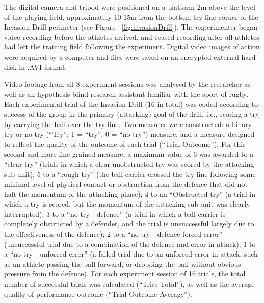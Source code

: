 \begin{CJK}{UTF8}{gbsn}
The digital camera and tripod were positioned on a platform 2m above the level of the playing field, approximately 10-15m from the bottom try-line corner of the Invasion Drill perimeter (see Figure ~\ref{fig:invasionDrill}). The experimenter began video recording before the athletes arrived, and ceased recording after all athletes had left the training field following the experiment. Digital video images of action were acquired by a computer and files were saved on an encrypted external hard disk in .AVI format.


Video footage from all 8 experiment sessions was analysed by the researcher as well as an hypothesis blind research assistant familiar with the sport of rugby.  Each experimental trial of the Invasion Drill (16 in total) was coded according to success of the group in the primary (attacking) goal of the drill, i.e., scoring a try by carrying the ball over the try line.  Two measures were constructed: a binary try or no try (``Try''; 1 = ``try'', 0 = ``no try'') measure, and a measure designed to reflect the quality of the outcome of each trial (``Trial Outcome''). For this second and more fine-grained measure, a maximum value of 6 was awarded to a ``clear try'' (trials in which a clear unobstructed try was scored by the attacking sub-unit); 5 to a ``rough try'' (the ball-carrier crossed the try-line following some minimal level of physical contact or obstruction from the defence that did not halt the momentum of the attacking phase); 4 to an ``Obstructed try'' (a trial in which a try is scored, but the momentum of the attacking sub-unit was clearly interrupted); 3 to a ``no try - defence'' (a trial in which a ball carrier is completely obstructed by a defender, and the trial is unsuccessful largely due to the effectiveness of the defence); 2 to a ``no try - defence forced error'' (unsuccessful trial due to a combination of the defence and error in attack); 1 to a ``no try - unforced error'' (a failed trial due to an unforced error in attack, such as an athlete passing the ball forward, or dropping the ball without obvious pressure from the defence).  For each experiment session of 16 trials, the total number of successful trials was calculated (``Tries Total''), as well as the average quality of performance outcome (``Trial Outcome Average'').



\end{CJK}

